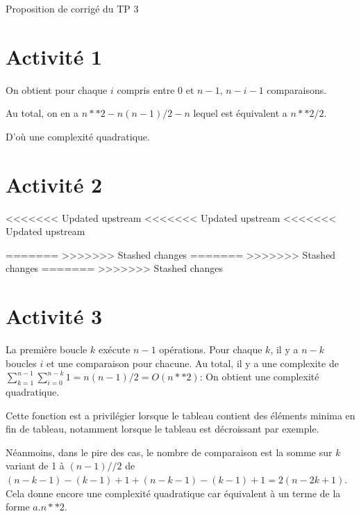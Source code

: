 
	
\begin{Large}
	Proposition de corrigé du TP 3
\end{Large}


\section*{Activité 1}



\eject 



On obtient pour chaque $i$ compris entre 0 et $n-1$, $n-i-1$ comparaisons.

Au total, on en a $n**2-n(n-1)/2-n$ lequel est équivalent a $n**2/2$.

D'où une complexité quadratique.


\eject

\section*{Activité 2}

<<<<<<< Updated upstream
<<<<<<< Updated upstream
<<<<<<< Updated upstream

\vspace{3.5cm}
=======
\vspace{3.5cm}
>>>>>>> Stashed changes
=======
\vspace{3.5cm}
>>>>>>> Stashed changes
=======
\vspace{3.5cm}
>>>>>>> Stashed changes

\eject \section*{Activité 3}



La première boucle $k$ ex\'ecute $n-1$ opérations. Pour chaque $k$, il y a $n-k$ boucles $i$ et une comparaison pour chacune. Au total, il y a une complexite de $\displaystyle\sum_{k=1}^{n-1}\sum_{i=0}^{n-k} 1 =n(n-1)/2 = O(n**2)$:
On obtient une complexité quadratique.



Cette fonction est a privilégier lorsque le tableau contient des éléments minima en fin de tableau, notamment lorsque le tableau est décroissant par exemple.

Néanmoins, dans le pire des cas, le nombre de comparaison est la somme sur $k$ variant de 1 à $(n-1)//2$ de $(n-k-1)-(k-1)+1+(n-k-1)-(k-1)+1=2(n-2k+1)$. Cela donne encore une complexité quadratique car équivalent à un terme de la forme $a.n**2$.



